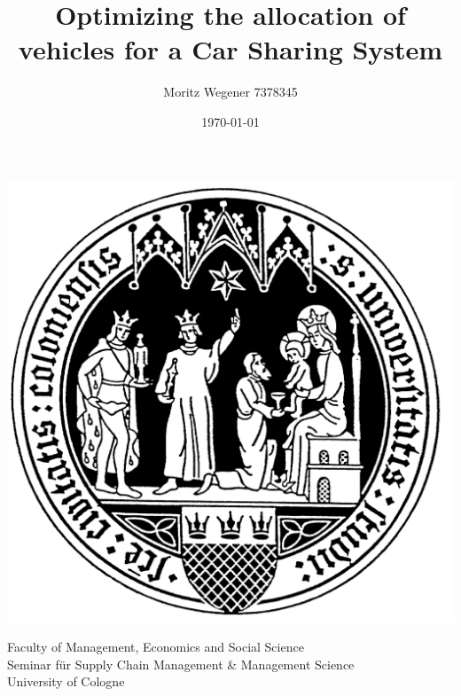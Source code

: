 \documentclass[11pt]{scrartcl}
\title{Optimizing the allocation of vehicles for a Car  Sharing System}
\author{ Moritz Wegener  7378345}  %
\begin{document}
\renewcommand{\labelenumi}{\alph{enumi})}		

\date{\today}

\maketitle   

{\centering
	\includegraphics[scale =0.1]{Universitaet_zu_Koeln-Siegel.jpg}
	
	\vspace{2cm}
	\begin{center}
		Faculty of Management, Economics and Social Science \\
		Seminar für Supply Chain Management \& Management Science \\
		University of Cologne \\
		
	\end{center}
	
	
	\thispagestyle{empty}
	
	
	
	
	
}

\newpage
\thispagestyle{empty}
\quad
\newpage
\thispagestyle{empty}
\end{document}
